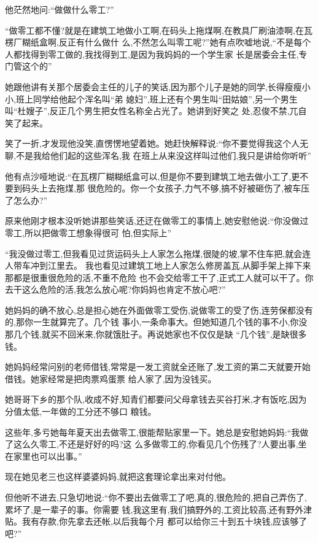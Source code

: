 ﻿\documentclass[12pt]{article}
\begin{document}
他茫然地问:``做\myrule 做什么零工?''

``做零工都不懂?就是在建筑工地做小工啊,在码头上拖煤啊,在教具厂刷油漆啊,在瓦楞厂糊纸盒啊,反正有什么做什
么,不然怎么叫零工呢?''她有点吹嘘地说,``不是每个人都找得到零工做的,我找得到工,是因为我妈妈的一个学生家
长是居委会主任,专门管这个的\myrule ''

她跟他讲有关那个居委会主任的儿子的笑话,因为那个儿子是她的同学,长得瘦瘦小小,班上同学给他起个浑名叫``弟
媳妇'',班上还有个男生叫``田姑娘'',另一个男生叫``杜嫂子'',反正几个男生把女性名称全占光了。她讲到好笑之
处,忍俊不禁,兀自笑了起来。

笑了一折,才发现他没笑,直愣愣地望着她。她赶快解释说:``你不要觉得我这个人无聊,不是我给他们起的这些浑名,我
在班上从来没这样叫过他们,我只是讲给你听听\myrule ''

他有点沙哑地说:``在瓦楞厂糊糊纸盒可以,但是你不要到建筑工地去做小工了,更不要到码头上去\myrule 拖煤,那
很危险的。你一个女孩子,力气不够,搞不好被砸伤了,被车压了怎么办?''

原来他刚才根本没听她讲那些笑话,还迂在做零工的事情上,她安慰他说:``你没做过零工,所以把做零工想象得很可
怕,但实际上\myrule ''

``我没做过零工,但我看见过货运码头上人家怎么拖煤,很陡的坡,掌不住车把,就会连人带车冲到江里去\myrule 。
我也看见过建筑工地上人家怎么修房盖瓦,从脚手架上摔下来\myrule 那\myrule 都是很重很危险的活,不重不危险
也不会交给零工干了,正式工人就可以干了。你去干这么危险的活,我\myrule 怎么放心呢?你妈妈也肯定不放心吧?''

她妈妈的确不放心,总是担心她在外面做零工受伤,说做零工的受了伤,连劳保都没有的,那你一生就算完了。几个钱
事小,一条命事大。但她知道几个钱的事不小,你没那几个钱,就买不回米来,你就饿肚子。再说她家也不仅仅是缺
``几个钱'',是缺很多钱。

她妈妈经常问别的老师借钱,常常是一发工资就全还账了,发工资的第二天就要开始借钱。她家经常是把肉票鸡蛋票
给人家了,因为没钱买。

她哥哥下乡的那个队,收成不好,知青们都要问父母拿钱去买谷打米,才有饭吃,因为分值太低,一年做的工分还不够口
粮钱。

这些年,多亏她每年夏天出去做零工,很能帮贴家里一下。她总是安慰她妈妈:``我做了这么久零工,不还是好好的吗?这
么多做零工的,你看见几个伤残了?人要出事,坐在家里也可以出事。''

现在她见老三也这样婆婆妈妈,就把这套理论拿出来对付他。

但他听不进去,只急切地说:``你不要出去做零工了吧,真的,很危险的,把自己弄伤了,累坏了,是一辈子的事。你需要
钱,我这里有,我们搞野外的,工资比较高,还有野外津贴。我有存款\myrule ,你先拿去还\myrule 帐,以后我每个月
都可以给你三十到五十块钱\myrule ,应该够了吧?''
\end{document}
